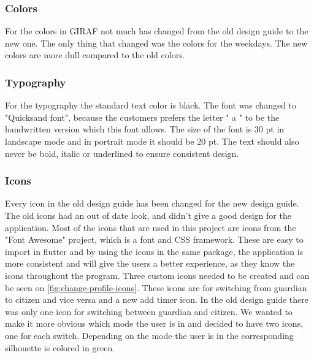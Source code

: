 \subsubsection{Colors}
For the colors in GIRAF not much has changed from the old design guide to the new one. 
The only thing that changed was the colors for the weekdays.
The new colors are more dull compared to the old colors.

\subsubsection{Typography}
For the typography the standard text color is black. The font was changed to "Quicksand font", because the customers prefers the letter " a " to be the handwritten version which this font allows.
The size of the font is 30 pt in landscape mode and in portrait mode it should be 20 pt.
The text should also never be bold, italic or underlined to ensure consistent design.

\subsubsection{Icons}
Every icon in the old design guide has been changed for the new design guide.
The old icons had an out of date look, and didn't give a good design for the application.
Most of the icons that are used in this project are icons from the "Font Awesome" project, which is a font and CSS framework.
These are easy to import in flutter and by using the icons in the same package, the application is more consistent and will give the users a better experience, as they know the icons throughout the program.
Three custom icons needed to be created and can be seen on \autoref{fig:change-profile-icons}. 
These icons are for switching from guardian to citizen and vice versa and a new add timer icon.
In the old design guide there was only one icon for switching between guardian and citizen.
We wanted to make it more obvious which mode the user is in and decided to have two icons, one for each switch.
Depending on the mode the user is in the corresponding silhouette is colored in green.


